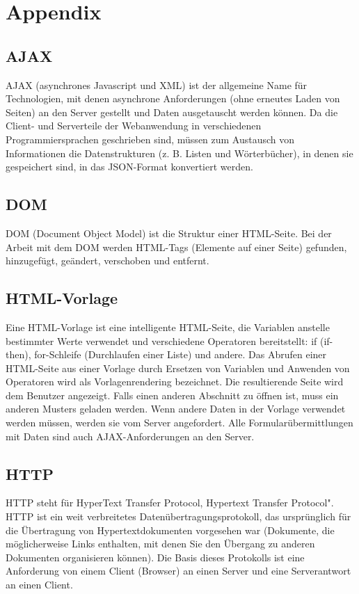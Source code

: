 \appendix
\chapter{Appendix}

\section*{AJAX}
\label{sec:appendix:ajax}
AJAX (asynchrones Javascript und XML) ist der allgemeine Name für Technologien, mit denen asynchrone Anforderungen (ohne erneutes Laden von Seiten) an den Server gestellt und Daten ausgetauscht werden können. Da die Client- und Serverteile der Webanwendung in verschiedenen Programmiersprachen geschrieben sind, müssen zum Austausch von Informationen die Datenstrukturen (z. B. Listen und Wörterbücher), in denen sie gespeichert sind, in das JSON-Format konvertiert werden.

\section*{DOM}
\label{sec:appendix:dom}
DOM (Document Object Model) ist die Struktur einer HTML-Seite. Bei der Arbeit mit dem DOM werden HTML-Tags (Elemente auf einer Seite) gefunden, hinzugefügt, geändert, verschoben und entfernt.

\section*{HTML-Vorlage}
\label{sec:appendix:html}
Eine HTML-Vorlage ist eine intelligente HTML-Seite, die Variablen anstelle bestimmter Werte verwendet und verschiedene Operatoren bereitstellt: if (if-then), for-Schleife (Durchlaufen einer Liste) und andere. Das Abrufen einer HTML-Seite aus einer Vorlage durch Ersetzen von Variablen und Anwenden von Operatoren wird als Vorlagenrendering bezeichnet. Die resultierende Seite wird dem Benutzer angezeigt. Falls einen anderen Abschnitt zu öffnen ist, muss ein anderen Musters geladen werden. Wenn andere Daten in der Vorlage verwendet werden müssen, werden sie vom Server angefordert. Alle Formularübermittlungen mit Daten sind auch AJAX-Anforderungen an den Server.

\section*{HTTP}
\label{sec:appendix:http}
HTTP steht für HyperText Transfer Protocol, Hypertext Transfer Protocol". HTTP ist ein weit verbreitetes Datenübertragungsprotokoll, das ursprünglich für die Übertragung von Hypertextdokumenten vorgesehen war (Dokumente, die möglicherweise Links enthalten, mit denen Sie den Übergang zu anderen Dokumenten organisieren können). Die Basis dieses Protokolls ist eine Anforderung von einem Client (Browser) an einen Server und eine Serverantwort an einen Client.

